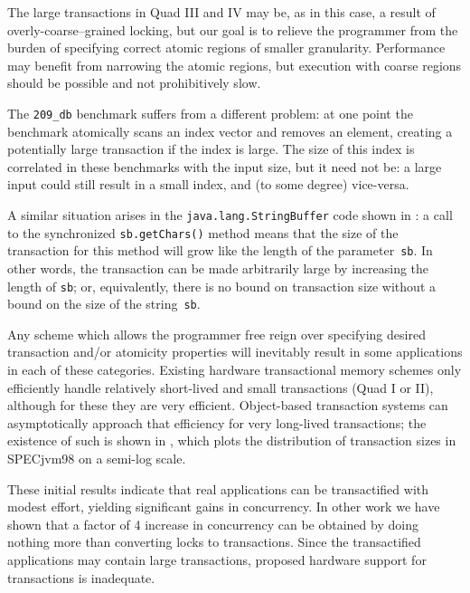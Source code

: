 The large transactions in Quad III and IV may be, as in this case, a result of
overly-coarse--grained locking, but our goal is to
relieve the programmer from the burden of specifying correct
atomic regions of smaller granularity.  Performance may benefit from
narrowing the atomic regions, but execution with coarse regions should
be possible and not prohibitively slow.

The \texttt{209\_db} benchmark suffers from a different problem: at one
point the benchmark atomically scans an index vector and removes an
element, creating a potentially large transaction if the index is
large.  The size of this index is correlated in these benchmarks with
the input size, but it need not be: a large input could still result
in a small index, and (to some degree) vice-versa.

A similar situation arises in the {\tt java.lang.StringBuffer} code
shown in :  a call to the synchronized
\texttt{sb.getChars()} method means that
the size of the transaction for this method will grow like the length
of the parameter~\texttt{sb}.  In other words, the transaction can be
made arbitrarily large by increasing the length of \texttt{sb}; or,
equivalently, there is no bound on transaction size without a bound on
the size of the string~\texttt{sb}.


Any scheme which allows the programmer free reign over specifying
desired transaction and/or atomicity properties will inevitably result
in some applications in each of these categories.  Existing
hardware transactional memory schemes only efficiently handle
relatively short-lived and small transactions (Quad I or II),
although for these they are very efficient.  Object-based
transaction systems can asymptotically approach that efficiency for
very long-lived transactions;  the existence of such is shown in
, which plots
the distribution of transaction sizes in SPECjvm98
on a semi-log scale.


\vspace*{5mm}

These initial results indicate that real applications can be
transactified with modest effort, yielding significant gains in
concurrency.  In other work \cite{AnanianAsKuLeLi04} we have shown
that a factor of 4 increase in concurrency can be obtained
by doing nothing more than converting locks to transactions.  Since
the transactified applications may contain large transactions,
proposed hardware support for transactions is inadequate.


